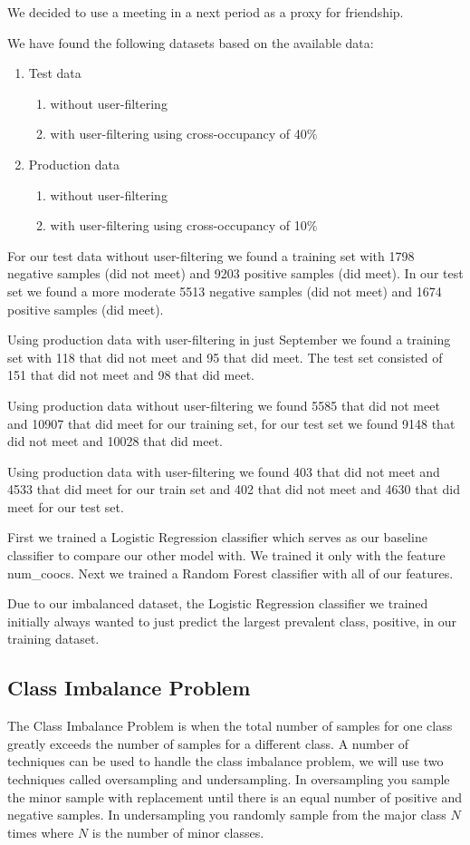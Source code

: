 We decided to use a meeting in a next period as a proxy for friendship.

We have found the following datasets based on the available data:
\begin{enumerate}
\item Test data
\begin{enumerate}
\item without user-filtering
\item with user-filtering using cross-occupancy of 40\%
\end{enumerate}
\item Production data
\begin{enumerate}
\item without user-filtering
\item with user-filtering using cross-occupancy of 10\%
\end{enumerate}
\end{enumerate}


For our test data without user-filtering we found a training set with 1798 negative samples (did not meet) and 9203 positive samples (did meet). In our test set we found a more moderate 5513 negative samples (did not meet) and 1674 positive samples (did meet).

Using production data with user-filtering in just September we found a training set with 118 that did not meet and 95 that did meet. The test set consisted of 151 that did not meet and 98 that did meet. 

Using production data without user-filtering we found 5585 that did not meet and 10907 that did meet for our training set, for our test set we found 9148 that did not meet and 10028 that did meet.

Using production data with user-filtering we found 403 that did not meet and 4533 that did meet for our train set and 402 that did not meet and 4630 that did meet for our test set.

First we trained a Logistic Regression classifier which serves as our baseline classifier to compare our other model with. We trained it only with the feature num\_coocs. Next we trained a Random Forest classifier with all of our features.

Due to our imbalanced dataset, the Logistic Regression classifier we trained initially always wanted to just predict the largest prevalent class, positive, in our training dataset.

\subsection{Class Imbalance Problem}
The Class Imbalance Problem is when the total number of samples for one class greatly exceeds the number of samples for a different class. A number of techniques can be used to handle the class imbalance problem, we will use two techniques called oversampling and undersampling\cite{tan2006introduction}. In oversampling you sample the minor sample with replacement until there is an equal number of positive and negative samples. In undersampling you randomly sample from the major class $N$ times where $N$ is the number of minor classes.

